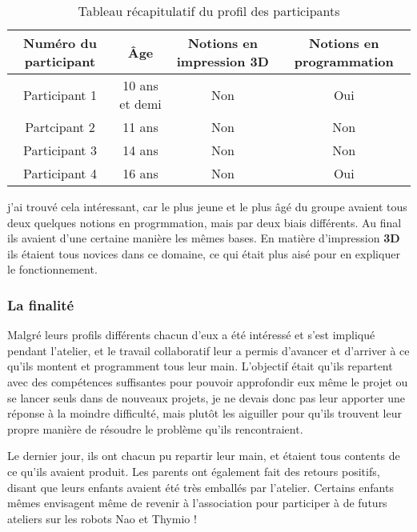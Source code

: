 \begin{table}[!h]
    \centering
    \begin{tabular}{|c|c|c|c|}
        \hline Numéro du participant & Âge & Notions en impression \textbf{3D} & Notions en programmation\\
        \hline Participant 1 & 10 ans et demi & Non & Oui\\
        \hline Partcipant 2 & 11 ans & Non & Non\\
        \hline Participant 3 & 14 ans & Non & Non\\
        \hline Participant 4 & 16 ans & Non & Oui\\
        \hline
    \end{tabular}
    \caption[\, \, Profil des participants]{Tableau récapitulatif du profil des participants}
    \label{tab_4.3.2.1}
\end{table}

j'ai trouvé cela intéressant, car le plus jeune et le plus âgé du groupe avaient tous deux quelques notions en progrmmation, mais par deux biais différents. Au final ils avaient d'une certaine manière les mêmes bases. En matière d'impression \textbf{3D} ils étaient tous novices dans ce domaine, ce qui était plus aisé pour en expliquer le fonctionnement. 
\subsubsection{La finalité}

Malgré leurs profils différents chacun d'eux a été intéressé et s'est impliqué pendant l'atelier, et le travail collaboratif leur a permis d'avancer et d'arriver à ce qu'ils montent et programment tous leur main. L'objectif était qu'ils repartent avec des compétences suffisantes pour pouvoir approfondir eux même le projet ou se lancer seuls dans de nouveaux projets, je ne devais donc pas leur apporter une réponse à la moindre difficulté, mais plutôt les aiguiller pour qu'ils trouvent leur propre manière de résoudre le problème qu'ils rencontraient.

\vspace{0.5cm}
Le dernier jour, ils ont chacun pu repartir leur main, et étaient tous contents de ce qu'ils avaient produit. Les parents ont également fait des retours positifs, disant que leurs enfants avaient été très emballés par l'atelier. Certains enfants mêmes envisagent même de revenir à l'association pour participer à de futurs ateliers sur les robots Nao et Thymio !






